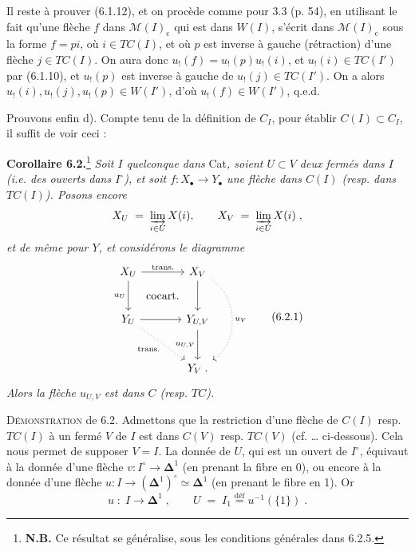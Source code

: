 \documentclass[11pt]{article}
\newcommand{\printedpage}[1]{\marginpar{\footnotesize p.~#1}}
\newcommand{\msp}[1]{\marginpar{\footnotesize [#1]}}
\newcommand{\Dl}{\boldsymbol{\Delta}}
\begin{document}
\printedpage{52}

\msp{page 104}

Il reste à prouver (6.1.12), et on procède comme pour 3.3 (p. 54), en utilisant le fait qu'une flèche $f$ dans $\mathcal{M}(I)_{\mathrm{c}}$ qui est dans $W(I)$, s'écrit dans $\mathcal{M}(I)_{\mathrm{c}}$ sous la forme $f = pi$, où $i \in TC(I)$, et où $p$ est inverse à gauche (rétraction) d'une flèche $j \in TC(I)$. On aura donc $u_!(f) = u_!(p)u_!(i)$, et $u_!(i) \in TC(I')$ par (6.1.10), et $u_!(p)$ est inverse à gauche de $u_!(j) \in TC(I')$. On a alors $u_!(i), u_!(j), u_!(p) \in W(I')$, d'où $u_!(f) \in W(I')$, q.e.d.

Prouvons enfin d). Compte tenu de la définition de $C_I$, pour établir $C(I) \subset C_I$, il suffit de voir ceci :

\textbf{Corollaire 6.2.}\footnote[31]{\textbf{N.B.} Ce résultat se généralise, sous les conditions générales dans 6.2.5.} \textit{Soit $I$ quelconque dans} Cat\textit{, soient $U \subset V$ deux fermés dans $I$ (i.e. des ouverts dans $I^{\circ}$), et soit $f : X_{\bullet} \longrightarrow Y_{\bullet}$ une flèche dans $C(I)$ (resp. dans $TC(I)$). Posons encore}
\msp{page 105}
\[
X_U \;=\; \varinjlim_{i\in U} X(i), \qquad X_V \;=\; \varinjlim_{i\in U} X(i)\;, %
\]
\textit{et de même pour $Y$, et considérons le diagramme}
\[
\begin{tikzcd}[row sep=large, column sep=large]
X_U \arrow[r, "\text{trans.}"] \arrow[d, "u_U"'] \arrow[dr, phantom, "\text{cocart.}"] & X_V \arrow[d] \arrow[dd, dotted, bend left=60, "u_V"] \\
Y_U \arrow[r] \arrow[dr, dotted, "\text{trans.}"'] & Y_{U,V} \arrow[d, "u_{U,V}"'] \\
 & Y_V\;.
\end{tikzcd}
\tag*{(6.2.1)}
\]
\textit{Alors la flèche $u_{U,V}$ est dans $C$ (resp. $TC$).}

\textsc{Démonstration} de 6.2. Admettons que la restriction d'une flèche de $C(I)$ resp. $TC(I)$ à un fermé $V$ de $I$ est dans $C(V)$ resp. $TC(V)$ (cf. \dots{} ci-dessous). Cela nous permet de supposer $V = I$. La donnée de $U$, qui est un ouvert de $I^{\circ}$, équivaut à la donnée d'une flèche $v : I^{\circ} \longrightarrow \Dl^1$ (en prenant la fibre en 0), ou encore à la donnée d'une flèche $u : I \longrightarrow (\Dl^1)^{\circ} \simeq \Dl^1$ (en prenant le fibre en 1). Or %
\[
u \;:\; I \longrightarrow \Dl^1\;, \qquad U \;=\; I_1 \overset{\text{déf}}{=} u^{-1}(\{1\})\;.
\tag*{(6.2.2)}
\]
\end{document}
